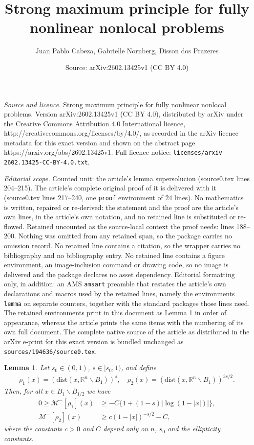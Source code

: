 \documentclass[10pt,a4paper]{amsart}
\title{Strong maximum principle for fully nonlinear nonlocal problems}
\author{Juan Pablo Cabeza, Gabrielle Nornberg, Disson dos Prazeres}
\date{Source: arXiv:2602.13425v1 (CC BY 4.0)}
\newtheorem{lemma}{Lemma}
\begin{document}
\maketitle

\noindent\emph{Source and licence.} Strong maximum principle for fully nonlinear nonlocal problems. Version arXiv:2602.13425v1 (CC BY 4.0), distributed by arXiv under the Creative Commons Attribution 4.0 International licence, http://creativecommons.org/licenses/by/4.0/, as recorded in the arXiv licence metadata for this exact version and shown on the abstract page https://arxiv.org/abs/2602.13425v1. Full licence notice: \texttt{licenses/arxiv-2602.13425-CC-BY-4.0.txt}.\par\smallskip

\noindent\textit{Editorial scope.} Counted unit: the article's lemma supersolucion (source0.tex lines 204--215). The article's complete original proof of it is delivered with it (source0.tex lines 217--240, one \texttt{proof} environment of 24 lines). No mathematics is written, repaired or re-derived: the statement and the proof are the article's own lines, in the article's own notation, and no retained line is substituted or re-flowed.  Retained uncounted as the source-local context the proof needs: lines 188--200.  Nothing was omitted from any retained span, so the package carries no omission record.  No retained line contains a citation, so the wrapper carries no bibliography and no bibliography entry.  No retained line contains a figure environment, an image-inclusion command or drawing code, so no image is delivered and the package declares no asset dependency.  Editorial formatting only, in addition: an AMS \texttt{amsart} preamble that restates the article's own declarations and macros used by the retained lines, namely the environments \texttt{lemma} on separate counters, together with the standard packages those lines need.  The retained environments print in this document as Lemma 1 in order of appearance, whereas the article prints the same items with the numbering of its own full document.  The complete native source of the article as distributed in the arXiv e-print for this exact version is bundled unchanged as \texttt{sources/194636/source0.tex}.
\begin{lemma}\label{rho}
    Let \(s_0\in(0,1)\), \(s\in[s_0,1)\), and define
\begin{align*}
    \rho_{1}(x) = (\mathrm{dist}(x, \mathbb{R}^{n}\backslash B_{1}))^{s},  
    \quad
    \rho_{2}(x) = (\mathrm{dist}(x, \mathbb{R}^{n}\backslash B_{1}))^{3s/2}. 
\end{align*} Then, for all \(x\in B_{1}\backslash B_{1/2}\) we have
    \begin{align*}
        0  \geq \mathcal{M}^{-}[\rho_{1}](x) &\geq -C\{1+(1-s)|\log(1-|x|)|\}, \\
        \mathcal{M}^{-}[\rho_{2}](x) &\geq c(1-|x|)^{-s/2} - C,
    \end{align*}
    where the constants \(c>0\) and \(C\) depend only on \(n\), \(s_0\) and the ellipticity constants.
\end{lemma}
\end{document}
